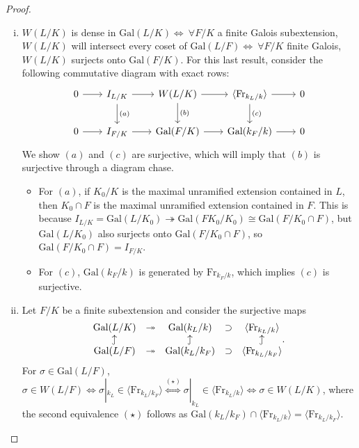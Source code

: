 \documentclass{article}
\theoremstyle{definition}
\begin{document}
\begin{proof}
    \begin{enumerate}[(i)]
        \item $W(L/K)$ is dense in $\text{Gal}(L/K) \iff ~\forall F/K$ a finite Galois subextension, $W(L/K)$ will intersect every coset of $\text{Gal}(L/F) \iff ~\forall F/K$ finite Galois, $W(L/K)$ surjects onto $\text{Gal}(F/K)$. For this last result, consider the following commutative diagram with exact rows:
        $$\begin{tikzcd}[row sep=2em, column sep=2em]
            0\rar & I_{L/K} \dar["(a)"] \rar[""] & W(L/K) \dar["(b)"] \rar[""]& \langle \text{Fr}_{k_L/k} \rangle \dar["(c)"] \rar & 0 \\
            0\rar & I_{F/K} \rar[""]& \text{Gal}(F/K) \rar[""]& \text{Gal}(k_F/k) \rar & 0
        \end{tikzcd}$$
        We show $(a)$ and $(c)$ are surjective, which will imply that $(b)$ is surjective through a diagram chase.
        \begin{itemize}
            \item For $(a)$, if $K_0/K$ is the maximal unramified extension contained in $L$, then $K_0 \cap F$ is the maximal unramified extension contained in $F$. This is because $I_{L/K} = \text{Gal}(L/K_0) \twoheadrightarrow \text{Gal}(FK_0/K_0) \cong \text{Gal}(F/K_0 \cap F)$, but $\text{Gal}(L/K_0)$ also surjects onto $\text{Gal}(F/K_0 \cap F)$, so $\text{Gal}(F/K_0 \cap F) = I_{F/K}$.
            \item For $(c)$, $\text{Gal}(k_F/k)$ is generated by $\text{Fr}_{k_F/k}$, which implies $(c)$ is surjective.
        \end{itemize}
        \item Let $F/K$ be a finite subextension and consider the surjective maps 
        \begin{align*}
            \begin{matrix} \text{Gal}(L/K) & \twoheadrightarrow & \text{Gal}(k_L/k) & \supset & \langle \text{Fr}_{k_L/k} \rangle \\ \rotatebox[origin=c]{90}{$\hookrightarrow$} & & \rotatebox[origin=c]{90}{$\hookrightarrow$}& & \rotatebox[origin=c]{90}{$\hookrightarrow$} \\ \text{Gal}(L/F) & \twoheadrightarrow & \text{Gal}(k_L/k_F) & \supset & \langle \text{Fr}_{k_L/k_F} \rangle \end{matrix}.
        \end{align*}
        For $\sigma \in \text{Gal}(L/F)$, $\sigma \in W(L/F) \iff \sigma|_{k_L} \in \langle \text{Fr}_{k_L/k_F} \rangle \stackrel{(\star)}{\iff} \sigma|_{k_L} \in \langle \text{Fr}_{k_L/k} \rangle \iff \sigma \in W(L/K)$, where the second equivalence $(\star)$ follows as $\text{Gal}(k_L/k_F) \cap \langle \text{Fr}_{k_L/k} \rangle = \langle \text{Fr}_{k_L/k_F} \rangle$.

\end{enumerate}
\end{proof}
\end{document}
